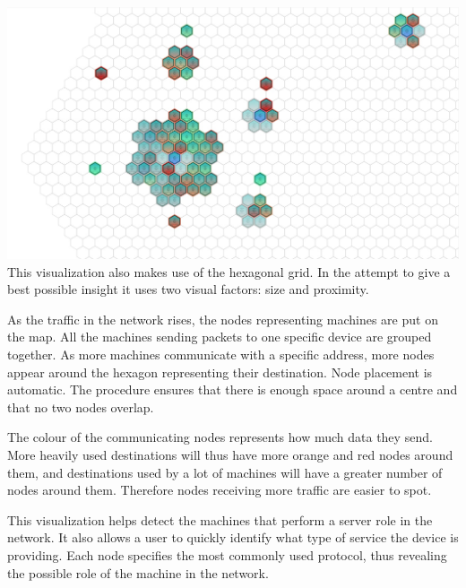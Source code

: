 \includegraphics[width=\linewidth]{materials/groups.jpg}
This visualization also makes use of the hexagonal grid. In the attempt to give
a best possible insight it uses two visual factors: size and proximity.

As the traffic in the network rises, the nodes representing machines are put on
the map. All the machines sending packets to one specific device are grouped
together. As more machines communicate with a specific address, more nodes
appear around the hexagon representing their destination. Node placement is
automatic. The procedure ensures that there is enough space around a centre
and that no two nodes overlap.

The colour of the communicating nodes represents how much data they send. More
heavily used destinations will thus have more orange and red nodes around them,
and destinations used by a lot of machines will have a greater number of nodes
around them. Therefore nodes receiving more traffic are easier to spot.

This visualization helps detect the machines that perform a server role in the
network. It also allows a user to quickly identify what type of service the device
is providing. Each node specifies the most commonly used protocol, thus
revealing the possible role of the machine in the network.

